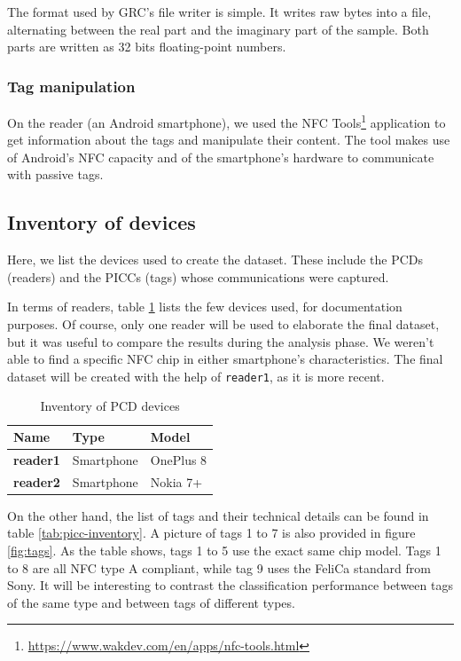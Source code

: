 The format used by GRC's file writer is simple. It writes raw bytes into a file, alternating between the real part and the imaginary part of the sample. Both parts are written as 32 bits floating-point numbers.

\subsubsection{Tag manipulation}

On the reader (an Android smartphone), we used the NFC Tools\footnote{\url{https://www.wakdev.com/en/apps/nfc-tools.html}} application to get information about the tags and manipulate their content. The tool makes use of Android's NFC capacity and of the smartphone's hardware to communicate with passive tags.

\subsection{Inventory of devices}

Here, we list the devices used to create the dataset. These include the PCDs (readers) and the PICCs (tags) whose communications were captured.

In terms of readers, table \ref{tab:pcd-inventory} lists the few devices used, for documentation purposes. Of course, only one reader will be used to elaborate the final dataset, but it was useful to compare the results during the analysis phase. We weren't able to find a specific NFC chip in either smartphone's characteristics. The final dataset will be created with the help of \texttt{reader1}, as it is more recent.

\begin{table}[h!]
  \centering
  \begin{tabular}{|l|l|l|}
    \hline
    \textbf{Name}    & \textbf{Type} & \textbf{Model} \\ \hline
    \textbf{reader1} & Smartphone    & OnePlus 8      \\ \hline
    \textbf{reader2} & Smartphone    & Nokia 7+       \\ \hline
  \end{tabular}
  \caption{Inventory of PCD devices}
  \label{tab:pcd-inventory}
\end{table}

On the other hand, the list of tags and their technical details can be found in table \ref{tab:picc-inventory}. A picture of tags 1 to 7 is also provided in figure \ref{fig:tags}. As the table shows, tags 1 to 5 use the exact same chip model. Tags 1 to 8 are all NFC type A compliant, while tag 9 uses the FeliCa standard from Sony. It will be interesting to contrast the classification performance between tags of the same type and between tags of different types.


